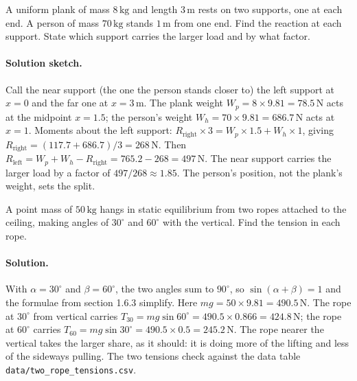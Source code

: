 \begin{exercise}
A uniform plank of mass $8\,\si{\kilogram}$ and length
$3\,\si{\meter}$ rests on two supports, one at each end. A person of
mass $70\,\si{\kilogram}$ stands $1\,\si{\meter}$ from one end. Find
the reaction at each support. State which support carries the
larger load and by what factor.
\paragraph{Solution sketch.} Call the near support (the one the person
stands closer to) the left support at $x = 0$ and the far one at $x =
3\,\si{\meter}$. The plank weight $W_p = 8 \times 9.81 = 78.5\,\text{N}$
acts at the midpoint $x = 1.5$; the person's weight $W_h = 70 \times
9.81 = 686.7\,\text{N}$ acts at $x = 1$. Moments about the left support:
$R_{\text{right}} \times 3 = W_p \times 1.5 + W_h \times 1$, giving
$R_{\text{right}} = (117.7 + 686.7)/3 = 268\,\text{N}$. Then
$R_{\text{left}} = W_p + W_h - R_{\text{right}} = 765.2 - 268 =
497\,\text{N}$. The near support carries the larger load by a factor of
$497/268 \approx 1.85$. The person's position, not the plank's weight,
sets the split.
\end{exercise}

\begin{exercise}
A point mass of $50\,\si{\kilogram}$ hangs in static equilibrium from
two ropes attached to the ceiling, making angles of $30^{\circ}$ and
$60^{\circ}$ with the vertical. Find the tension in each rope.
\paragraph{Solution.} With $\alpha = 30^{\circ}$ and $\beta =
60^{\circ}$, the two angles sum to $90^{\circ}$, so $\sin(\alpha+\beta)
= 1$ and the formulae from section 1.6.3 simplify. Here $mg = 50 \times
9.81 = 490.5\,\text{N}$. The rope at $30^{\circ}$ from vertical carries
$T_{30} = mg\sin 60^{\circ} = 490.5 \times 0.866 = 424.8\,\text{N}$; the
rope at $60^{\circ}$ carries $T_{60} = mg\sin 30^{\circ} = 490.5 \times
0.5 = 245.2\,\text{N}$. The rope nearer the vertical takes the larger
share, as it should: it is doing more of the lifting and less of the
sideways pulling. The two tensions check against the data table
\texttt{data/two\_rope\_tensions.csv}.
\end{exercise}


